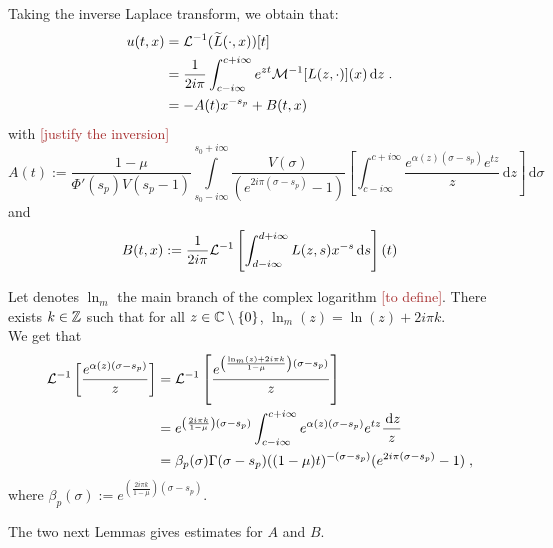 \documentclass[11pt]{amsart}
\newcommand{\diff}{\,\mathrm{d}}
\newcommand{\ndr}[1]{\textcolor{brown}{[#1]}}
\begin{document}
Taking the inverse Laplace transform, we obtain that: 
\begin{align*}
     u(t,x) &= \Lcal^{-1}(\tilde L(\cdot, x))[t] \\
     &= \frac{1}{2i\pi } \int_{c-i\infty}^{c+i\infty} e^{zt}\Mcal^{-1}[L(z,\cdot)](x) \diff z
     \eqfinp\\
     &= -A(t)x^{-s_p} + B(t,x)
\end{align*}
with \ndr{justify the inversion}
\begin{equation}
    A(t) :=\frac{1-\mu}{\Phi'(s_p) V(s_p-1)}
     \int\limits_{s_0-i\infty}^{s_0+i\infty}
     \frac{V(\sigma)
  }{(e^{2i\pi(\sigma-s_p)}-1)} \left[\int_{c-i\infty}^{c+i\infty} \frac{e^{ \alpha(z)(\sigma-s_p)}e^{tz}}{z}\diff z \right] \diff \sigma
  \label{def:A} 
\end{equation}
and 
\begin{equation}
    B(t,x) := \frac{1}{2i\pi} \Lcal^{-1}\left[\int_{d-i\infty}^{d+i\infty} L(z,s)x^{-s}\diff s \right] (t)
\label{def:B}
\end{equation}

Let denotes $\ln_{m}$  the main branch of the complex logarithm \ndr{to define}. There exists $k \in \mathbb{Z}$ such that for all $z \in \mathbb{C} \setminus \{0\}$, $\ln_m(z) = \ln(z) + 2i\pi k. $ \\
We get that 
\begin{subequations}
\begin{align}
    \Lcal^{-1}\left[ \frac{e^{ \alpha(z)(\sigma-s_p)}}{z}  \right]
    &= 
    \Lcal^{-1}\left[ \frac{e^{ \left( \frac{\ln_m(z) + 2i\pi k}{1-\mu} \right) (\sigma-s_p)}}{z}  \right] \\
    &= 
    e^{ \left( \frac{2i\pi k}{1-\mu} \right) (\sigma-s_p)}
    \int_{c-i\infty}^{c+i\infty} e^{ \alpha(z)(\sigma-s_p)}e^{tz}\frac{\diff z}{z}\\
    &= \beta_p(\sigma) \Gamma(\sigma-s_p)((1-\mu)t)^{-(\sigma-s_p)}(e^{2i\pi(\sigma-s_p)}-1)
    \eqfinv
\end{align}
\label{eq:calcLaplInv}
\end{subequations}
where $\beta_p(\sigma) := e^{ \left( \frac{2i\pi k}{1-\mu} \right) (\sigma-s_p)}$. 

The two next Lemmas gives estimates for $A$ and $B$. 
\end{document}
